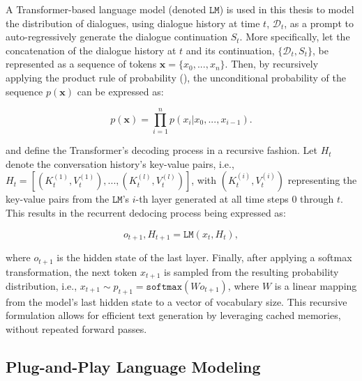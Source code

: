 A Transformer-based language model (denoted $\texttt{LM}$) is used in this thesis to model the distribution of dialogues, using dialogue history at time $t$, $\mathcal{D}_t$, as a prompt to auto-regressively generate the dialogue continuation $S_t$. More specifically, let the concatenation of the dialogue history at $t$ and its continuation, $\{\mathcal{D}_t, S_t\}$, be represented as a sequence of tokens $\textbf{x}= \{x_0, ..., x_n\}$. Then, by recursively applying the product rule of probability (\cite{bishop2006pattern}), the unconditional probability of the sequence $p(\textbf{x})$ can be expressed as:

\begin{equation}
    p(\textbf{x}) = \prod_{i = 1}^n p(x_i | x_0, ..., x_{i - 1}).
\end{equation}

\cite{dathathri2019plug} and \cite{madotto-etal-2020-plug} define the Transformer's decoding process in a recursive fashion. Let $H_t$ denote the conversation history's key-value pairs, i.e., $H_t = \left[ (K_t^{(1)}, V_t^{(1)}), ..., (K_t^{(l)}, V_t^{(l)}) \right]$, with $(K_t^{(i)}, V_t^{(i)})$ representing the key-value pairs from the $\texttt{LM}$'s $i$-th layer generated at all time steps $0$ through $t$. This results in the recurrent dedocing process being expressed as:

\begin{equation}
    o_{t + 1}, H_{t + 1} = \texttt{LM} \left( x_t, H_t \right),
\label{eq:transformer_lm_io}
\end{equation}

where $o_{t + 1}$ is the hidden state of the last layer. Finally, after applying a softmax transformation, the next token $x_{t + 1}$ is sampled from the resulting probability distribution, i.e.,  $x_{t + 1} \sim p_{t + 1} = \texttt{softmax} \left( W o_{t + 1} \right)$, where $W$ is a linear mapping from the model's last hidden state to a vector of vocabulary size. This recursive formulation allows for efficient text generation by leveraging cached memories, without repeated forward passes.

\subsection{Plug-and-Play Language Modeling}
\label{sec:ppm}


